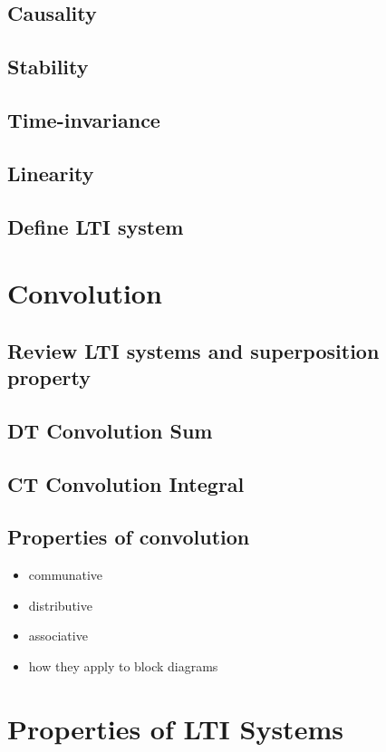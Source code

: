 \documentclass{article}
\begin{document}
\subsection{Causality}
\label{sec:org4314405}
\subsection{Stability}
\label{sec:orgdf1ed25}
\subsection{Time-invariance}
\label{sec:org0eb860c}
\subsection{Linearity}
\label{sec:org07e3ada}
\subsection{Define LTI system}
\label{sec:org920390a}
\section{Convolution}
\label{sec:org9c1558d}
\subsection{Review LTI systems and superposition property}
\label{sec:orgc9b2a56}
\subsection{DT Convolution Sum}
\label{sec:org9ec80b8}
\subsection{CT Convolution Integral}
\label{sec:orge42c03e}
\subsection{Properties of convolution}
\label{sec:orgbed0c56}
\begin{itemize}
\item communative
\item distributive
\item associative
\item how they apply to block diagrams
\end{itemize}
\section{Properties of LTI Systems}
\label{sec:orgdadbbac}
\end{document}
